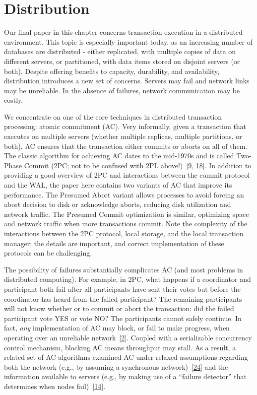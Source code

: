 \documentclass[b5paper,11pt,twoside,openright]{book}
\newcommand\Section[2]{
  \hypertarget{#1}{
    \section{#2}
  }
}
\begin{document}
\Section{distribution}{%
Distribution
}

Our final paper in this chapter concerns transaction execution in a
distributed environment. This topic is especially important today, as an
increasing number of databases are distributed - either replicated, with
multiple copies of data on different servers, or partitioned, with data
items stored on disjoint servers (or both). Despite offering benefits to
capacity, durability, and availability, distribution introduces a new
set of concerns. Servers may fail and network links may be unreliable.
In the absence of failures, network communication may be costly.

We concentrate on one of the core techniques in distributed transaction
processing: atomic commitment (AC). Very informally, given a transaction
that executes on multiple servers (whether multiple replicas, multiple
partitions, or both), AC ensures that the transaction either commits or
aborts on all of them. The classic algorithm for achieving AC dates to
the mid-1970s and is called Two-Phase Commit (2PC; not to be confused
with 2PL above!)~{{[}\protect\hyperlink{ref-gray-2pc}{9},
  \protect\hyperlink{ref-lampson-2pc}{18}{]}}. In addition to providing a
good overview of 2PC and interactions between the commit protocol and
the WAL, the paper here contains two variants of AC that improve its
performance. The Presumed Abort variant allows processes to avoid
forcing an abort decision to disk or acknowledge aborts, reducing disk
utilization and network traffic. The Presumed Commit optimization is
similar, optimizing space and network traffic when more transactions
commit. Note the complexity of the interactions between the 2PC
protocol, local storage, and the local transaction manager; the details
are important, and correct implementation of these protocols can be
challenging.

The possibility of failures substantially complicates AC (and most
problems in distributed computing). For example, in 2PC, what happens if
a coordinator and participant both fail after all participants have sent
their votes but before the coordinator has heard from the failed
participant? The remaining participants will not know whether or to
commit or abort the transaction: did the failed participant vote YES or
vote NO? The participants cannot safely continue. In fact, \emph{any}
implementation of AC may block, or fail to make progress, when operating
over an unreliable
network~{{[}\protect\hyperlink{ref-bernstein-book}{2}{]}}. Coupled with
a serializable concurrency control mechanism, blocking AC means
throughput may stall. As a result, a related set of AC algorithms
examined AC under relaxed assumptions regarding both the network (e.g.,
by assuming a synchronous
network)~{{[}\protect\hyperlink{ref-3pc}{24}{]}} and the information
available to servers (e.g., by making use of a ``failure detector'' that
determines when nodes fail)~{{[}\protect\hyperlink{ref-ac-srds}{14}{]}}.
\end{document}
